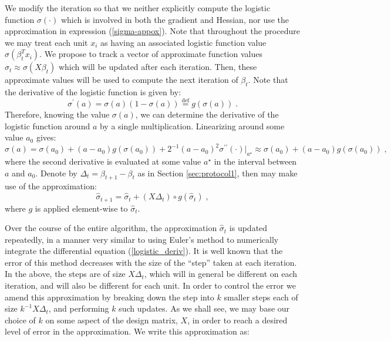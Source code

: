 \documentclass[11pt]{article}
\begin{document}
We modify the iteration so that we neither  explicitly compute the logistic function $\sigma(\cdot)$ which is involved in both the gradient and Hessian, nor use the approximation in expression (\ref{sigma-appox}).  Note that throughout the procedure we may treat each unit $x_i$ as having an associated logistic function value $\sigma(\beta_t^T x_i)$.  We propose to track a vector of approximate function values $\hat{\sigma}_t \approx \sigma(X\beta_t)$ which will be updated after each iteration.  Then, these approximate values will be used to compute the next iteration of $\beta_t$.  Note that the derivative of the logistic function is given by:
\begin{equation}\label{logistic_deriv} \sigma^\prime(a) = \sigma(a)(1-\sigma(a)) \stackrel{\text{def}}{=} g(\sigma(a)) \; .
\end{equation}
Therefore, knowing the value $\sigma(a)$, we can determine the derivative of the logistic function around $a$   by a single multiplication.  Linearizing around some value $a_0$ gives:
\begin{equation}\label{sigma_lin} \sigma(a) = \sigma(a_0) + (a-a_0)g(\sigma(a_0)) + 2^{-1}(a-a_0)^2\sigma^{\prime\prime}(\cdot)\big|_{a^\star} \approx \sigma(a_0) + (a-a_0)g(\sigma(a_0)) \; ,
\end{equation}
where the second derivative is evaluated at some value $a^\star$ in the interval between $a$ and $a_0$.  Denote by $\Delta_t = \beta_{t+1}-\beta_t$ as in Section \ref{sec:protocol1}, then may make use of the approximation:
\begin{equation}\label{sigma_approx} \hat{\sigma}_{t+1} = \hat{\sigma}_t + (X\Delta_t)\circ g(\hat{\sigma}_t) \; ,
\end{equation}
where $g$ is applied element-wise to $\hat{\sigma}_t$.


Over the course of the entire algorithm, the approximation $\hat{\sigma}_t$ is updated repeatedly, in a manner very similar to using Euler's method to numerically integrate the differential equation (\ref{logistic_deriv}).  It is well known that the error of this method decreases with the size of the ``step'' taken at each iteration. In the above, the steps are of size $X\Delta_t$, which will in general be different on each iteration, and will also be different for each unit.  In order to control the error we amend this approximation by breaking down the step into $k$ smaller steps each of size $k^{-1}X\Delta_t$, and performing $k$ such updates.  As we shall see, we may base our choice of $k$ on some aspect of the design matrix,  $X$, in order to reach a desired level of error in the approximation.  We write this approximation as:
\end{document}
